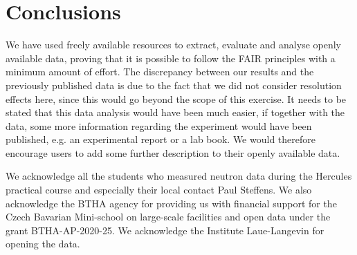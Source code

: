 \documentclass[aps,pra,reprint,amsmath,amssymb,superscriptaddress,showkeys]{revtex4-1}
\begin{document}
\section{Conclusions}

We have used freely available resources to extract, evaluate and analyse openly available data, proving that it is possible to follow the FAIR principles with a minimum amount of effort. 
The discrepancy between our results and the previously published data \cite{Aouissi} is due to the fact that we did not consider resolution effects here, since this would go beyond the scope of this exercise.
It needs to be stated that this data analysis would have been much easier, if together with the data, some more information regarding the experiment would have been published, e.g. an experimental report or a lab book.
We would therefore encourage users to add some further description to their openly available data. 


\begin{acknowledgments}
We acknowledge all the students who measured neutron data \cite{data} during the Hercules practical course and especially their local contact Paul Steffens. 
We also acknowledge the BTHA agency for providing us with financial support for the Czech Bavarian Mini-school on large-scale facilities and open data under the grant BTHA-AP-2020-25. We acknowledge the Institute Laue-Langevin for opening the data.
\end{acknowledgments}



\end{document}
